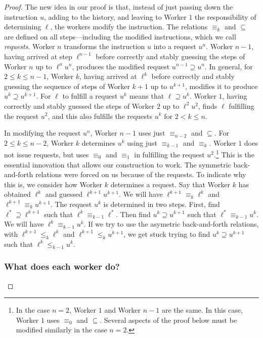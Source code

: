\documentclass[10pt,a4paper]{article}
\theoremstyle{definition}
\begin{document}
\begin{proof}
		The new idea in our proof is that, instead of just passing down the instruction $u$, adding to the history, and leaving to Worker $1$ the responsibility of determining $\ell$, the workers modify the instruction.  The relations $\equiv_k$ and $\subseteq$ are defined on all steps---including the modified instructions, which we call \emph{requests}.  Worker $n$ transforms the instruction $u$ into a request $u^n$.  Worker $n-1$, having arrived at step $\ell^{n-1}$ before correctly and stably guessing the steps of Worker $n$ up to $\ell^nu^n$, produces the modified request $u^{n-1}\supseteq u^n$.  In general, for $2\leq k \leq n-1$, Worker $k$, having arrived at $\ell^k$ before correctly and stably guessing the sequence of steps of Worker $k+1$ up to $u^{k+1}$, modifies it to produce $u^k\supseteq u^{k+1}$. For $\ell$ to fulfill a request $u^k$ means that $\ell\supseteq u^k$.  Worker $1$, having correctly and stably guessed the steps of Worker $2$ up to $\ell^2u^2$, finds $\ell$ fulfilling the request $u^2$, and this also fulfills the requests $u^k$ for $2 < k\leq n$.    
		
In modifying the request $u^n$, Worker $n-1$ uses just $\equiv_{n-2}$ and $\subseteq$.  For $2 \leq k \leq n-2$, Worker $k$ determines $u^k$ using just $\equiv_{k-1}$ and $\equiv_k$.  Worker $1$ does not issue requests, but uses $\equiv_0$ and $\equiv_1$ in fulfilling the request $u^2$.\footnote{In the case $n=2$, Worker $1$ and Worker $n-1$ are the same. In this case, Worker $1$ uses $\equiv_0$ and $\subseteq$.  Several aspects of the proof below must be modified similarly in the case $n = 2$.}  This is the essential innovation that allows our construction to work.  The symmetric back-and-forth relations were forced on us because of the requests.  To indicate why this is, we consider how Worker $k$ determines a request.  Say that Worker $k$ has obtained $\ell^k$ and guessed $\ell^{k+1}u^{k+1}$.  We will have $\ell^{k+1}\equiv_k\ell^k$ and $\ell^{k+1}\equiv_k u^{k+1}$.  The request $u^k$ is determined in two steps.  First, find $\ell^*\supseteq \ell^{k+1}$ such that $\ell^k\equiv_{k-1} \ell^*$.  Then find $u^k\supseteq u^{k+1}$ such that $\ell^*\equiv_{k-1} u^k$.  We will have $\ell^k\equiv_{k-1} u^k$.  If we try to use the asymetric back-and-forth relations, with $\ell^{k+1}\leq_k\ell^k$ and $\ell^{k+1}\leq_k u^{k+1}$, we get stuck trying to find $u^k\supseteq u^{k+1}$ such that $\ell^k\leq_{k-1} u^k$. 
		
		\subsubsection{What does each worker do?}
		

\end{proof}
\end{document}
